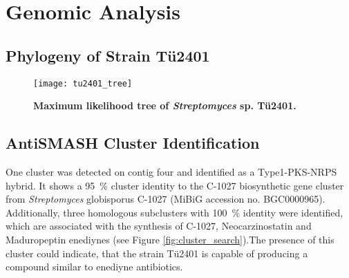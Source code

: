 

\section{Genomic Analysis} %
\label{sec:genomic_analysis}

    \subsection{Phylogeny of Strain Tü2401} %
    \label{sub:phylogeny_of_strain_tue2401}

	\begin{figure}[htbp]
		\label{fig:phylo_tree}
		\texttt{[image: tu2401\_tree]}
		\caption[Maximum likelihood tree of \emph{Streptomyces} sp. Tü2401.]{\textbf{Maximum likelihood tree of \emph{Streptomyces} sp. Tü2401.}} 
	\end{figure}


    \subsection{AntiSMASH Cluster Identification} %
    \label{sub:antismash_cluster_identification}

	 One cluster was detected on contig four and identified as a Type1-PKS-NRPS hybrid. It shows a 95~\% cluster identity to the C-1027 biosynthetic gene cluster from \textit{Streptomyces} globisporus C-1027 (MiBiG accession no. BGC0000965). Additionally, three homologous subclusters with 100~\% identity were identified, which are associated with the synthesis of C-1027, Neocarzinostatin and Maduropeptin enediynes (see Figure \ref{fig:cluster_search}).The presence of this cluster could indicate, that the strain Tü2401 is capable of producing a compound similar to enediyne antibiotics. 
	 
